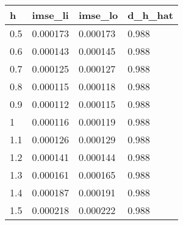 \begin{tabular}{llll}
  \hline
h & imse\_li & imse\_lo & d\_h\_hat \\ 
  \hline
0.5 & 0.000173 & 0.000173 & 0.988 \\ 
  0.6 & 0.000143 & 0.000145 & 0.988 \\ 
  0.7 & 0.000125 & 0.000127 & 0.988 \\ 
  0.8 & 0.000115 & 0.000118 & 0.988 \\ 
  0.9 & 0.000112 & 0.000115 & 0.988 \\ 
  1 & 0.000116 & 0.000119 & 0.988 \\ 
  1.1 & 0.000126 & 0.000129 & 0.988 \\ 
  1.2 & 0.000141 & 0.000144 & 0.988 \\ 
  1.3 & 0.000161 & 0.000165 & 0.988 \\ 
  1.4 & 0.000187 & 0.000191 & 0.988 \\ 
  1.5 & 0.000218 & 0.000222 & 0.988 \\ 
   \hline
\end{tabular}
